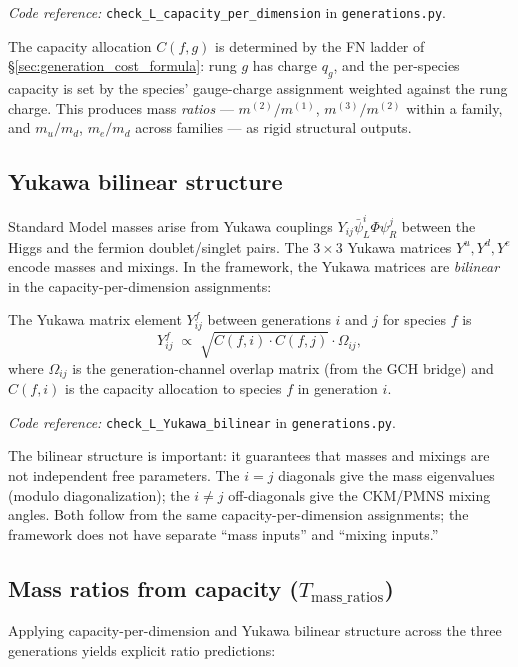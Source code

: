 \documentclass[11pt]{article}
\newcommand{\coderef}[2]{\smallskip\noindent\textit{Code reference:} \texttt{#1} in \texttt{#2}.}
\newcommand{\epitag}[1]{\textbf{[#1]}}
\theoremstyle{definition}
\begin{document}
\coderef{check\_L\_capacity\_per\_dimension}{generations.py}

The capacity allocation $C(f, g)$ is determined by the FN ladder of \S\ref{sec:generation_cost_formula}: rung $g$ has charge $q_g$, and the per-species capacity is set by the species' gauge-charge assignment weighted against the rung charge. This produces mass \emph{ratios} --- $m^{(2)} / m^{(1)}$, $m^{(3)} / m^{(2)}$ within a family, and $m_u / m_d$, $m_e / m_d$ across families --- as rigid structural outputs.

\subsection{Yukawa bilinear structure}\label{sec:yukawa_bilinear}

Standard Model masses arise from Yukawa couplings $Y_{ij} \bar\psi_L^i \Phi \psi_R^j$ between the Higgs and the fermion doublet/singlet pairs. The $3\times 3$ Yukawa matrices $Y^u, Y^d, Y^e$ encode masses and mixings. In the framework, the Yukawa matrices are \emph{bilinear} in the capacity-per-dimension assignments:

\begin{tcolorbox}[apfbox, title={$L_{\mathrm{Yukawa\_bilinear}}$ \epitag{P\_structural}}]
The Yukawa matrix element $Y_{ij}^f$ between generations $i$ and $j$ for species $f$ is
\[
Y_{ij}^f \;\propto\; \sqrt{C(f, i) \cdot C(f, j)} \cdot \Omega_{ij},
\]
where $\Omega_{ij}$ is the generation-channel overlap matrix (from the GCH bridge) and $C(f, i)$ is the capacity allocation to species $f$ in generation $i$.
\end{tcolorbox}

\coderef{check\_L\_Yukawa\_bilinear}{generations.py}

The bilinear structure is important: it guarantees that masses and mixings are not independent free parameters. The $i = j$ diagonals give the mass eigenvalues (modulo diagonalization); the $i \neq j$ off-diagonals give the CKM/PMNS mixing angles. Both follow from the same capacity-per-dimension assignments; the framework does not have separate ``mass inputs'' and ``mixing inputs.''

\subsection{Mass ratios from capacity ($T_{\mathrm{mass\_ratios}}$)}\label{sec:mass_ratios}

Applying capacity-per-dimension and Yukawa bilinear structure across the three generations yields explicit ratio predictions:
\end{document}
